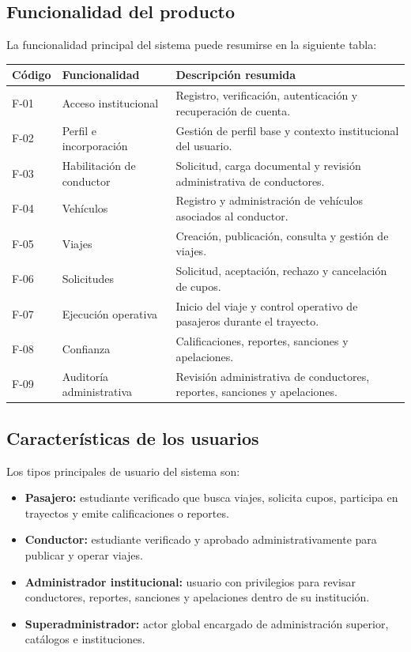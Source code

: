 \documentclass[12pt]{article}
\begin{document}
\subsection{Funcionalidad del producto}

La funcionalidad principal del sistema puede resumirse en la siguiente tabla:

\begin{longtable}{|P{2.2cm}|P{4.5cm}|P{7.7cm}|}
\hline
{}
\textbf{C\'odigo} & \textbf{Funcionalidad} & \textbf{Descripci\'on resumida} \\
\hline
F-01 & Acceso institucional & Registro, verificaci\'on, autenticaci\'on y recuperaci\'on de cuenta. \\
\hline
F-02 & Perfil e incorporaci\'on & Gesti\'on de perfil base y contexto institucional del usuario. \\
\hline
F-03 & Habilitaci\'on de conductor & Solicitud, carga documental y revisi\'on administrativa de conductores. \\
\hline
F-04 & Veh\'iculos & Registro y administraci\'on de veh\'iculos asociados al conductor. \\
\hline
F-05 & Viajes & Creaci\'on, publicaci\'on, consulta y gesti\'on de viajes. \\
\hline
F-06 & Solicitudes & Solicitud, aceptaci\'on, rechazo y cancelaci\'on de cupos. \\
\hline
F-07 & Ejecuci\'on operativa & Inicio del viaje y control operativo de pasajeros durante el trayecto. \\
\hline
F-08 & Confianza & Calificaciones, reportes, sanciones y apelaciones. \\
\hline
F-09 & Auditor\'ia administrativa & Revisi\'on administrativa de conductores, reportes, sanciones y apelaciones. \\
\hline
\end{longtable}

\subsection{Caracter\'isticas de los usuarios}

Los tipos principales de usuario del sistema son:

\begin{itemize}[leftmargin=1.2cm]
    \item \textbf{Pasajero:} estudiante verificado que busca viajes, solicita cupos, participa en trayectos y emite calificaciones o reportes.
    \item \textbf{Conductor:} estudiante verificado y aprobado administrativamente para publicar y operar viajes.
    \item \textbf{Administrador institucional:} usuario con privilegios para revisar conductores, reportes, sanciones y apelaciones dentro de su instituci\'on.
    \item \textbf{Superadministrador:} actor global encargado de administraci\'on superior, cat\'alogos e instituciones.
\end{itemize}
\end{document}
